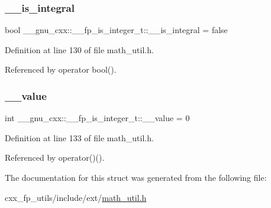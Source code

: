\subsubsection{\texorpdfstring{\+\_\+\+\_\+is\+\_\+integral}{\_\_is\_integral}}
{\footnotesize\ttfamily bool \+\_\+\+\_\+gnu\+\_\+cxx\+::\+\_\+\+\_\+fp\+\_\+is\+\_\+integer\+\_\+t\+::\+\_\+\+\_\+is\+\_\+integral = false}



Definition at line 130 of file math\+\_\+util.\+h.



Referenced by operator bool().

\mbox{\label{struct____gnu__cxx_1_1____fp__is__integer__t_ad30e10c2e2dc2b23d42b4bbbf5592425}} 
\subsubsection{\texorpdfstring{\+\_\+\+\_\+value}{\_\_value}}
{\footnotesize\ttfamily int \+\_\+\+\_\+gnu\+\_\+cxx\+::\+\_\+\+\_\+fp\+\_\+is\+\_\+integer\+\_\+t\+::\+\_\+\+\_\+value = 0}



Definition at line 133 of file math\+\_\+util.\+h.



Referenced by operator()().



The documentation for this struct was generated from the following file\+:\begin{DoxyCompactItemize}
\item 
cxx\+\_\+fp\+\_\+utils/include/ext/\hyperlink{math__util_8h}{math\+\_\+util.\+h}\end{DoxyCompactItemize}
